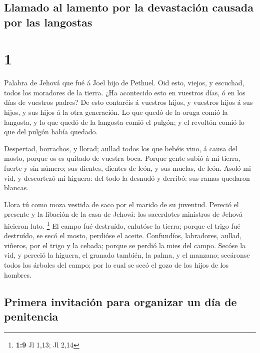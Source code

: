 \hypertarget{llamado-al-lamento-por-la-devastaciuxf3n-causada-por-las-langostas}{%
\subsection{Llamado al lamento por la devastación causada por las
langostas}\label{llamado-al-lamento-por-la-devastaciuxf3n-causada-por-las-langostas}}

\hypertarget{section}{%
\section{1}\label{section}}

 Palabra de Jehová que fué á Joel hijo de Pethuel.
 Oid esto, viejos, y escuchad, todos los moradores de la
tierra. ¿Ha acontecido esto en vuestros días, ó en los días de vuestros
padres?  De esto contaréis á vuestros hijos, y vuestros
hijos á sus hijos, y sus hijos á la otra generación.  Lo que
quedó de la oruga comió la langosta, y lo que quedó de la langosta comió
el pulgón; y el revoltón comió lo que del pulgón había quedado.

 Despertad, borrachos, y llorad; aullad todos los que bebéis
vino, á causa del mosto, porque os es quitado de vuestra boca.
 Porque gente subió á mi tierra, fuerte y sin número; sus
dientes, dientes de león, y sus muelas, de león.  Asoló mi
vid, y descortezó mi higuera: del todo la desnudó y derribó: sus ramas
quedaron blancas.

 Llora tú como moza vestida de saco por el marido de su
juventud.  Pereció el presente y la libación de la casa de
Jehová: los sacerdotes ministros de Jehová hicieron luto. \footnote{\textbf{1:9}
  Jl 1,13; Jl 2,14}  El campo fué destruído, enlutóse la
tierra; porque el trigo fué destruído, se secó el mosto, perdióse el
aceite.  Confundíos, labradores, aullad, viñeros, por el
trigo y la cebada; porque se perdió la mies del campo. 
Secóse la vid, y pereció la higuera, el granado también, la palma, y el
manzano; secáronse todos los árboles del campo; por lo cual se secó el
gozo de los hijos de los hombres.

\hypertarget{primera-invitaciuxf3n-para-organizar-un-duxeda-de-penitencia}{%
\subsection{Primera invitación para organizar un día de
penitencia}\label{primera-invitaciuxf3n-para-organizar-un-duxeda-de-penitencia}}

